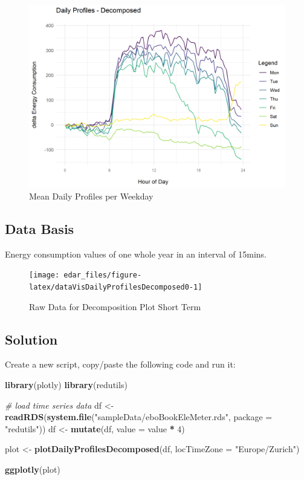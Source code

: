 \documentclass[
  a4paperpaper,
]{book}
\newenvironment{Shaded}{\begin{snugshade}}{\end{snugshade}}
\newcommand{\CommentTok}[1]{\textcolor[rgb]{0.56,0.35,0.01}{\textit{#1}}}
\newcommand{\DataTypeTok}[1]{\textcolor[rgb]{0.13,0.29,0.53}{#1}}
\newcommand{\DecValTok}[1]{\textcolor[rgb]{0.00,0.00,0.81}{#1}}
\newcommand{\KeywordTok}[1]{\textcolor[rgb]{0.13,0.29,0.53}{\textbf{#1}}}
\newcommand{\NormalTok}[1]{#1}
\newcommand{\OperatorTok}[1]{\textcolor[rgb]{0.81,0.36,0.00}{\textbf{#1}}}
\newcommand{\StringTok}[1]{\textcolor[rgb]{0.31,0.60,0.02}{#1}}
\let\oldShaded\Shaded
\let\endoldShaded\endShaded
\renewenvironment{Shaded}{\footnotesize\oldShaded}{\endoldShaded}
\begin{document}
\begin{figure}
\includegraphics[width=0.7\linewidth]{images/plotDailyProfDecomposed} \caption{Mean Daily Profiles per Weekday}\label{fig:unnamed-chunk-20}
\end{figure}

\hypertarget{data-basis-11}{%
\subsection{Data Basis}\label{data-basis-11}}

Energy consumption values of one whole year in an interval of 15mins.

\begin{figure}
\texttt{[image: edar\_files/figure-latex/dataVisDailyProfilesDecomposed0-1]} \caption{Raw Data for Decomposition Plot Short Term}\label{fig:dataVisDailyProfilesDecomposed0}
\end{figure}

\newpage

\hypertarget{solution-11}{%
\subsection{Solution}\label{solution-11}}

Create a new script, copy/paste the following code and run it:

\begin{Shaded}
\begin{Highlighting}[]
\KeywordTok{library}\NormalTok{(plotly)}
\KeywordTok{library}\NormalTok{(redutils)}

\CommentTok{# load time series data}
\NormalTok{df <-}\StringTok{ }\KeywordTok{readRDS}\NormalTok{(}\KeywordTok{system.file}\NormalTok{(}\StringTok{"sampleData/eboBookEleMeter.rds"}\NormalTok{, }\DataTypeTok{package =} \StringTok{"redutils"}\NormalTok{))}
\NormalTok{df <-}\StringTok{ }\KeywordTok{mutate}\NormalTok{(df, }\DataTypeTok{value =}\NormalTok{ value }\OperatorTok{*}\StringTok{ }\DecValTok{4}\NormalTok{)}

\NormalTok{plot <-}\StringTok{ }\KeywordTok{plotDailyProfilesDecomposed}\NormalTok{(df, }\DataTypeTok{locTimeZone =} \StringTok{"Europe/Zurich"}\NormalTok{)}

\KeywordTok{ggplotly}\NormalTok{(plot)}
\end{Highlighting}
\end{Shaded}
\end{document}
